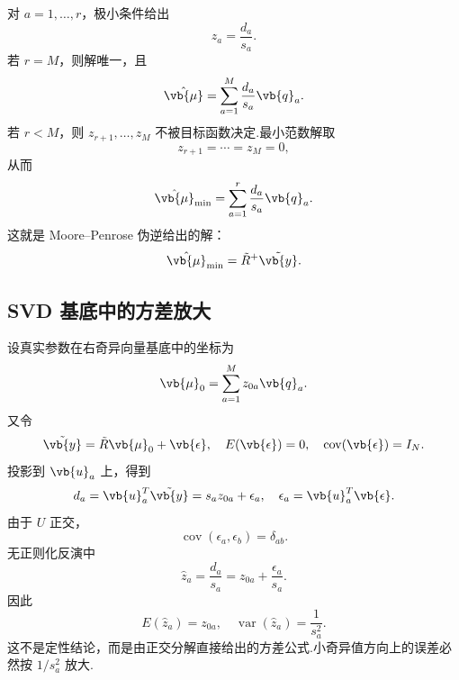 对 \(a=1,\ldots,r\)，极小条件给出
\begin{equation*}
	z_a=\frac{d_a}{s_a}.
\end{equation*}
若 \(r=M\)，则解唯一，且
\begin{equation*}
	\hat{\vb{\mu}}
	=\sum_{a=1}^{M}\frac{d_a}{s_a}\vb{q}_a.
\end{equation*}
若 \(r<M\)，则 \(z_{r+1},\ldots,z_M\) 不被目标函数决定.最小范数解取
\begin{equation*}
	z_{r+1}=\cdots=z_M=0,
\end{equation*}
从而
\begin{equation*}
	\hat{\vb{\mu}}_{\rm min}
	=\sum_{a=1}^{r}\frac{d_a}{s_a}\vb{q}_a.
\end{equation*}
这就是 Moore--Penrose 伪逆给出的解：
\begin{equation*}
	\hat{\vb{\mu}}_{\rm min}
	=\tilde{R}^{+}\tilde{\vb{y}}.
\end{equation*}

\subsection{SVD 基底中的方差放大}

设真实参数在右奇异向量基底中的坐标为
\begin{equation*}
	\vb{\mu}_0=\sum_{a=1}^{M}z_{0a}\vb{q}_a.
\end{equation*}
又令
\begin{equation*}
	\tilde{\vb{y}}=\tilde{R}\vb{\mu}_0+\vb{\epsilon},
	\quad
	E(\vb{\epsilon})=0,\quad
	\operatorname{cov}(\vb{\epsilon})=I_N.
\end{equation*}
投影到 \(\vb{u}_a\) 上，得到
\begin{equation*}
	d_a=\vb{u}_a^T\tilde{\vb{y}}
	=s_az_{0a}+\epsilon_a,
	\quad
	\epsilon_a=\vb{u}_a^T\vb{\epsilon}.
\end{equation*}
由于 \(U\) 正交，
\begin{equation*}
	\operatorname{cov}(\epsilon_a,\epsilon_b)=\delta_{ab}.
\end{equation*}
无正则化反演中
\begin{equation*}
	\hat{z}_a=\frac{d_a}{s_a}
	=z_{0a}+\frac{\epsilon_a}{s_a}.
\end{equation*}
因此
\begin{equation*}
	E(\hat{z}_a)=z_{0a},\quad
	\operatorname{var}(\hat{z}_a)=\frac{1}{s_a^2}.
\end{equation*}
这不是定性结论，而是由正交分解直接给出的方差公式.小奇异值方向上的误差必然按 \(1/s_a^2\) 放大.

